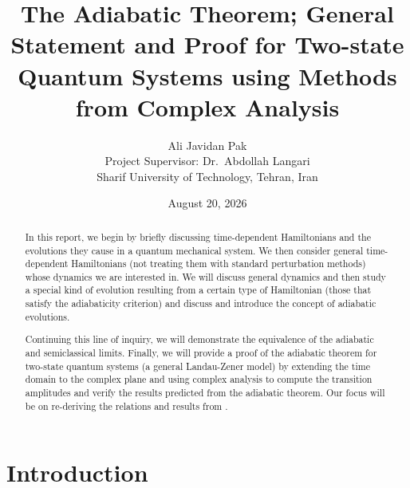 \documentclass[12pt,a4paper]{article}
\begin{document}
	
	\title{\LARGE \textbf{The Adiabatic Theorem; General Statement and Proof for Two-state Quantum Systems using Methods from Complex Analysis}}
	
	\author{\Large Ali Javidan Pak \\ [0.35cm]
		Project Supervisor: Dr.~Abdollah Langari \\ [0.35cm]
		\large Sharif University of Technology, Tehran, Iran}
	
	\date{August 20, 2026}
	
	\maketitle
	\thispagestyle{empty}
	
	\vspace{2cm}
	\begin{abstract}
		In this report, we begin by briefly discussing time-dependent Hamiltonians and the evolutions they cause in a quantum mechanical system. We then consider general time-dependent Hamiltonians (not treating them with standard perturbation methods) whose dynamics we are interested in. We will discuss general dynamics and then study a special kind of evolution resulting from a certain type of Hamiltonian (those that satisfy the adiabaticity criterion) and discuss and introduce the concept of adiabatic evolutions.
		
		Continuing this line of inquiry, we will demonstrate the equivalence of the adiabatic and semiclassical limits. Finally, we will provide a proof of the adiabatic theorem for two-state quantum systems (a general Landau-Zener model) by extending the time domain to the complex plane and using complex analysis to compute the transition amplitudes and verify the results predicted from the adiabatic theorem. Our focus will be on re-deriving the relations and results from \cite{DavisPechukas1976}. 
	\end{abstract}
	
	\newpage
	\tableofcontents
	\newpage
	
	\section{Introduction}
	\label{sec:introduction}
	
\end{document}
